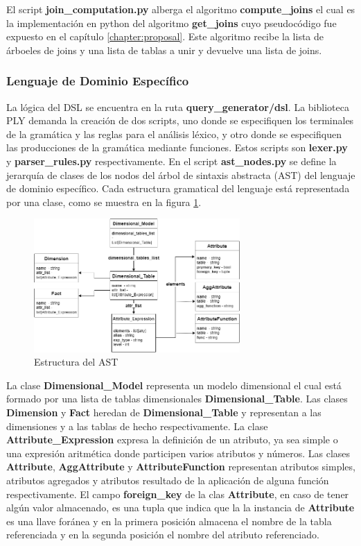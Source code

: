 El script \textbf{join\_computation.py} alberga el algoritmo \textbf{compute\_joins} el cual es la implementaci\'on 
en python del algoritmo \textbf{get\_joins} cuyo pseudoc\'odigo fue expuesto en el cap\'itulo \ref{chapter:proposal}. 
Este algoritmo recibe la lista de \'arboeles de joins y una lista de tablas a unir y devuelve una lista de joins.

\subsubsection{Lenguaje de Dominio Espec\'ifico}

La l\'ogica del DSL se encuentra en la ruta \textbf{query\_generator/dsl}. La biblioteca 
PLY demanda la creaci\'on de dos scripts, uno donde se especifiquen los terminales de la gram\'atica y las reglas 
para el an\'alisis l\'exico, y otro donde se especifiquen las producciones de la gram\'atica mediante funciones. Estos 
scripts son \textbf{lexer.py} y \textbf{parser\_rules.py} respectivamente. En el script \textbf{ast\_nodes.py} se define  
la jerarqu\'ia de clases de los nodos del \'arbol de sintaxis abstracta (AST) del lenguaje de dominio espec\'ifico. Cada 
estructura gramatical del lenguaje est\'a representada por una clase, como se muestra en la figura \ref{fig:ast}.

\begin{figure}[htb]
    \centering
    \includegraphics[width=0.7\textwidth]{Graphics/ast.png}
    \caption{Estructura del AST}
    \label{fig:ast}
\end{figure}

La clase \textbf{Dimensional\_Model} representa un modelo dimensional el cual est\'a formado por una lista de tablas 
dimensionales \textbf{Dimensional\_Table}. Las clases \textbf{Dimension} y \textbf{Fact} heredan de \textbf{Dimensional\_Table} 
y representan a las dimensiones y a las tablas de hecho respectivamente. La clase \textbf{Attribute\_Expression} expresa 
la definici\'on de un atributo, ya sea simple o una expresi\'on aritm\'etica donde participen varios atributos y n\'umeros. 
Las clases \textbf{Attribute}, \textbf{AggAttribute} y \textbf{AttributeFunction} representan atributos simples, atributos 
agregados y atributos resultado de la aplicación de alguna funci\'on respectivamente. El campo \textbf{foreign\_key} de 
la clas \textbf{Attribute}, en caso de tener alg\'un valor almacenado, es una tupla que indica que la la instancia 
de \textbf{Attribute} es una llave for\'anea y en la primera posici\'on almacena el nombre de la tabla referenciada y 
en la segunda posici\'on el nombre del atributo referenciado.

